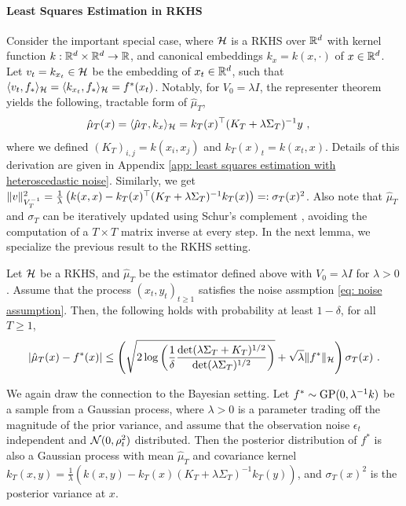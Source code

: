 \paragraph{Least Squares Estimation in RKHS}
Consider the important special case, where $\mathcal{H}$ is a RKHS over $\mathbb{R}^d$ with kernel function $k:\mathbb{R}^d \times \mathbb{R}^d \rightarrow \mathbb{R}$, and canonical embeddings $k_x = k(x, \cdot)$ of $x \in \mathbb{R}^d$. Let $v_t =k_{x_t} \in \mathcal{H}$ be the embedding of $x_t \in \mathbb{R}^d$, such that $\langle v_t, f_*\rangle_{\mathcal{H}} = \langle k_{x_t}, f_*\rangle_{\mathcal{H}} = f^*(x_t)$. Notably, for $V_0 = \lambda I$, the representer theorem yields the following, tractable form of $\hat{\mu}_T$,
\begin{align*}
\hat{\mu}_T(x) &= \langle\hat{\mu}_T, k_x \rangle_{\mathcal{H}} = k_T(x)^\top (K_T + \lambda \Sigma_T)^{-1}y \text{ ,}
\end{align*}
where we defined $(K_T)_{i,j} =  k(x_i,x_j)$ and $k_T(x)_t =  k(x_t,x)$. Details of this derivation are given in Appendix \ref{app: least squares estimation with heteroscedastic noise}. Similarly, we get  $\|v\|_{V_T^{-1}}^2 = \frac{1}{\lambda} \left(k(x,x) - k_T(x)^\top(K_T + \lambda \Sigma_T)^{-1}k_T(x)\right) =: \sigma_T(x)^2$.  Also note that $\hat{\mu}_T$ and $\sigma_T$ can be iteratively updated using Schur's complement \cite[Appendix F]{ChowdhuryKernelizedMultiarmedBandits2017}, avoiding the computation of a $T\times T$ matrix inverse at every step. In the next lemma, we specialize the previous result to the RKHS setting. 
\begin{lemma}\label{lemma: concentration inequalities for RKHS regression}
	Let $\mathcal{H}$ be a RKHS, and $\hat{\mu}_T$ be the estimator defined above with $V_0 = \lambda I$ for $\lambda > 0$. Assume that the process $(x_t,y_t)_{t\geq 1}$ satisfies the noise assmption \eqref{eq: noise assumption}. Then, the following holds with probability at least $1-\delta$, for all $T \geq 1$, 
	\begin{align*}
	|\hat{\mu}_T(x) - f^*(x)| \leq  \left(\sqrt{2\log\left(\frac{1}{\delta}\frac{\det(\lambda \Sigma_T + K_T)^{1/2}}{\det(\lambda \Sigma_T)^{1/2}}\right)} + \sqrt{\lambda} \| f^*\|_{\mathcal{H}}\right) \sigma_T(x) \text{ .}
	\end{align*}
\end{lemma}

We again draw the connection to the Bayesian setting. Let $f^* \sim \text{GP}(0, \lambda^{-1} k)$ be a sample from a Gaussian process, where $\lambda > 0$ is a parameter trading off the magnitude of the prior variance, and assume that the observation noise $\epsilon_t$  independent and $\mathcal{N}(0, \rho_t^2)$ distributed. Then the posterior distribution of $f^*$ is also a Gaussian process with mean $\hat{\mu}_T$ and covariance kernel\linebreak $k_T(x,y) = \frac{1}{\lambda}\left(k(x,y) - k_T(x)(K_T + \lambda \Sigma_T)^{-1}k_T(y)\right)$, and $\sigma_T(x)^2$ is the posterior variance at $x$.

